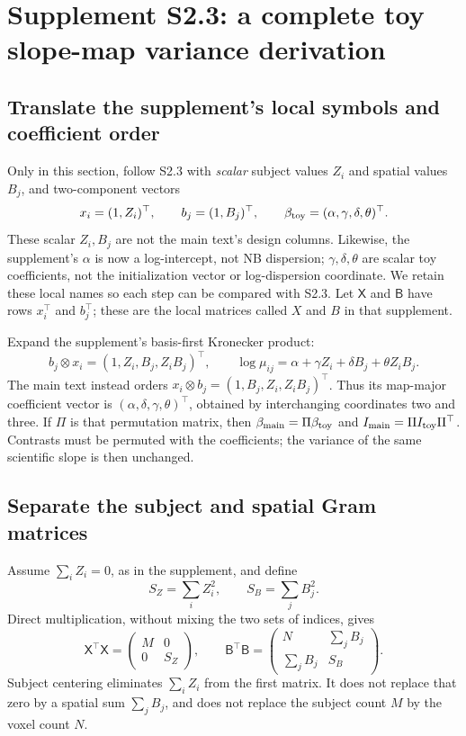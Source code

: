 \documentclass[11pt,a4paper]{article}
\numberwithin{equation}{section}
\begin{document}
\section{Supplement S2.3: a complete toy slope-map variance derivation}
\label{lesion-toy-variance}

\subsection{Translate the supplement's local symbols and coefficient order}
Only in this section, follow S2.3 with \emph{scalar} subject values
$Z_i$ and spatial values $B_j$, and two-component vectors
\[
 x_i=(1,Z_i)^\top,\qquad b_j=(1,B_j)^\top,\qquad
 \beta_{\rm toy}=(\alpha,\gamma,\delta,\theta)^\top.
\]
These scalar $Z_i,B_j$ are not the main text's design columns.
Likewise, the supplement's $\alpha$ is now a log-intercept, not
NB dispersion; $\gamma,\delta,\theta$ are scalar toy coefficients,
not the initialization vector or log-dispersion coordinate.
We retain these local names so each step can be compared with S2.3.
Let $\mathsf X$ and $\mathsf B$ have rows $x_i^\top$ and $b_j^\top$;
these are the local matrices called $X$ and $B$ in that supplement.

Expand the supplement's basis-first Kronecker product:
\[
 b_j\otimes x_i=(1,Z_i,B_j,Z_iB_j)^\top,\qquad
 \log\mu_{ij}=\alpha+\gamma Z_i+\delta B_j+\theta Z_iB_j.
\]
The main text instead orders $x_i\otimes b_j=(1,B_j,Z_i,Z_iB_j)^\top$.
Thus its map-major coefficient vector is
$(\alpha,\delta,\gamma,\theta)^\top$, obtained by interchanging
coordinates two and three.
If $\Pi$ is that permutation matrix, then
$\beta_{\rm main}=\Pi\beta_{\rm toy}$ and
$I_{\rm main}=\Pi I_{\rm toy}\Pi^\top$.
Contrasts must be permuted with the coefficients; the variance
of the same scientific slope is then unchanged.

\subsection{Separate the subject and spatial Gram matrices}
Assume $\sum_i Z_i=0$, as in the supplement, and define
\[
 S_Z=\sum_i Z_i^2,\qquad S_B=\sum_j B_j^2.
\]
Direct multiplication, without mixing the two sets of indices, gives
\[
 \mathsf X^\top\mathsf X=
 \begin{pmatrix}M&0\\0&S_Z\end{pmatrix},\qquad
 \mathsf B^\top\mathsf B=
 \begin{pmatrix}N&\sum_jB_j\\\sum_jB_j&S_B\end{pmatrix}.
\]
Subject centering eliminates $\sum_iZ_i$ from the first matrix.
It does not replace that zero by a spatial sum $\sum_jB_j$,
and does not replace the subject count $M$ by the voxel count $N$.
\end{document}
